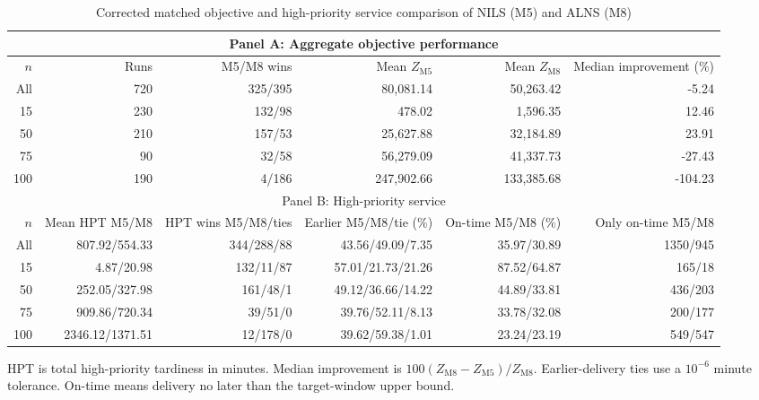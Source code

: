 \begin{table}[htbp]
\centering
\caption{Corrected matched objective and high-priority service comparison of NILS (M5) and ALNS (M8)}
\label{tab:m5_alns_corrected}
\scriptsize
\begin{tabular}{rrrrrr}
\toprule
\multicolumn{6}{c}{Panel A: Aggregate objective performance} \\
\midrule
$n$ & Runs & M5/M8 wins & Mean $Z_{\mathrm{M5}}$ & Mean $Z_{\mathrm{M8}}$ & Median improvement (\%) \\
All & 720 & 325/395 & 80,081.14 & 50,263.42 & -5.24 \\
15 & 230 & 132/98 & 478.02 & 1,596.35 & 12.46 \\
50 & 210 & 157/53 & 25,627.88 & 32,184.89 & 23.91 \\
75 & 90 & 32/58 & 56,279.09 & 41,337.73 & -27.43 \\
100 & 190 & 4/186 & 247,902.66 & 133,385.68 & -104.23 \\
\midrule
\multicolumn{6}{c}{Panel B: High-priority service} \\
\midrule
$n$ & Mean HPT M5/M8 & HPT wins M5/M8/ties & Earlier M5/M8/tie (\%) & On-time M5/M8 (\%) & Only on-time M5/M8 \\
All & 807.92/554.33 & 344/288/88 & 43.56/49.09/7.35 & 35.97/30.89 & 1350/945 \\
15 & 4.87/20.98 & 132/11/87 & 57.01/21.73/21.26 & 87.52/64.87 & 165/18 \\
50 & 252.05/327.98 & 161/48/1 & 49.12/36.66/14.22 & 44.89/33.81 & 436/203 \\
75 & 909.86/720.34 & 39/51/0 & 39.76/52.11/8.13 & 33.78/32.08 & 200/177 \\
100 & 2346.12/1371.51 & 12/178/0 & 39.62/59.38/1.01 & 23.24/23.19 & 549/547 \\
\bottomrule
\end{tabular}
\begin{flushleft}\footnotesize HPT is total high-priority tardiness in minutes. Median improvement is $100(Z_{\mathrm{M8}}-Z_{\mathrm{M5}})/Z_{\mathrm{M8}}$. Earlier-delivery ties use a $10^{-6}$ minute tolerance. On-time means delivery no later than the target-window upper bound.\end{flushleft}
\end{table}

